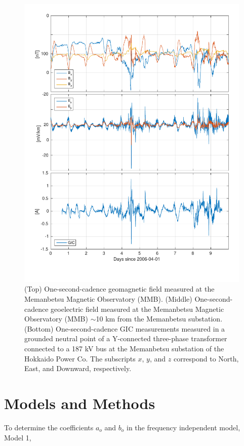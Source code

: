 \documentclass[draft,linenumbers]{agujournal2018}
\begin{document}
\begin{figure}[h]
\centering
\includegraphics[width=\textwidth]{figures/plot_raw_All_20060402.pdf}
\caption{(Top) One-second-cadence geomagnetic field measured at the Memanbetsu Magnetic Observatory (MMB). (Middle) One-second-cadence geoelectric field measured at the Memanbetsu Magnetic Observatory (MMB) $\sim$10 km from the Memanbetsu substation. (Bottom) One-second-cadence GIC measurements measured in a grounded neutral point of a Y-connected three-phase transformer connected to a 187 kV bus at the Memanbetsu substation of the Hokkaido Power Co. The subscripts $x$, $y$, and $z$ correspond to North, East, and Downward, respectively.}
\label{figure1}
\end{figure}

\section{Models and Methods}

To determine the coefficients $a_o$ and $b_o$ in the frequency independent model, Model 1,
\end{document}
